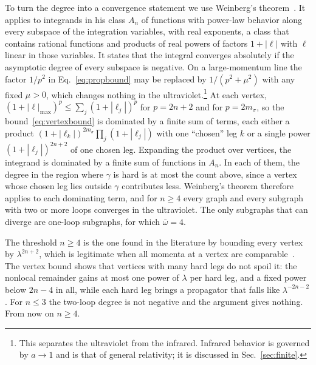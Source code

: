 \documentclass[a4paper,11pt]{article}
\begin{document}
To turn the degree into a convergence statement we use Weinberg's theorem~\cite{Weinberg1960}. It applies to integrands in his class $A_n$ of functions with power-law behavior along every subspace of the integration variables, with real exponents, a class that contains rational functions and products of real powers of factors $1+|\ell|$ with $\ell$ linear in those variables. It states that the integral converges absolutely if the asymptotic degree of every subspace is negative. On a large-momentum line the factor $1/p^2$ in Eq.~\eqref{eq:propbound} may be replaced by $1/(p^2+\mu^2)$ with any fixed $\mu>0$, which changes nothing in the ultraviolet.\footnote{This separates the ultraviolet from the infrared. Infrared behavior is governed by $a\to1$ and is that of general relativity; it is discussed in Sec.~\ref{sec:finite}.} At each vertex, $(1+|\ell|_{\max})^{p}\le\sum_j(1+|\ell_j|)^{p}$ for $p=2n+2$ and for $p=2m_\sigma$, so the bound~\eqref{eq:vertexbound} is dominated by a finite sum of terms, each either a product $(1+|\ell_k|)^{2m_\sigma}\prod_j(1+|\ell_j|)$ with one ``chosen'' leg $k$ or a single power $(1+|\ell_j|)^{2n+2}$ of one chosen leg. Expanding the product over vertices, the integrand is dominated by a finite sum of functions in $A_n$. In each of them, the degree in the region where $\gamma$ is hard is at most the count above, since a vertex whose chosen leg lies outside $\gamma$ contributes less. Weinberg's theorem therefore applies to each dominating term, and for $n\ge4$ every graph and every subgraph with two or more loops converges in the ultraviolet. The only subgraphs that can diverge are one-loop subgraphs, for which $\bar\omega=4$.

The threshold $n\ge4$ is the one found in the literature by bounding every vertex by $\lambda^{2n+2}$, which is legitimate when all momenta at a vertex are comparable~\cite{AsoreyLopezShapiro1997,Modesto2012}. The vertex bound shows that vertices with many hard legs do not spoil it: the nonlocal remainder gains at most one power of $\lambda$ per hard leg, and a fixed power below $2n-4$ in all, while each hard leg brings a propagator that falls like $\lambda^{-2n-2}$. For $n\le3$ the two-loop degree is not negative and the argument gives nothing. From now on $n\ge4$.
\end{document}
